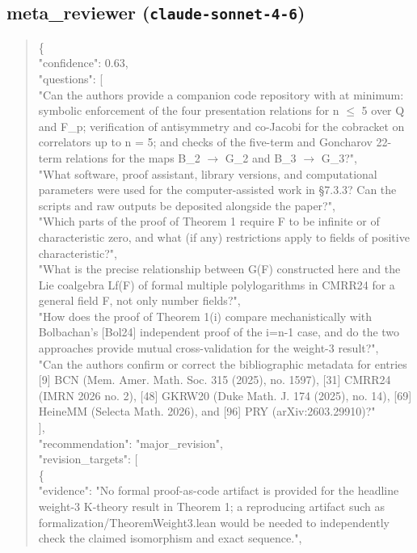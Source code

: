 \documentclass[11pt]{article}
\begin{document}
\subsection*{meta\_reviewer (\texttt{claude-sonnet-4-6})}
\begin{quote}\small\ttfamily\raggedright
\{\\
  "confidence": 0.63,\\
  "questions": [\\
    "Can the authors provide a companion code repository with at minimum: symbolic enforcement of the four presentation relations for n \ensuremath{\le} 5 over Q and F\_p; verification of antisymmetry and co-Jacobi for the cobracket on correlators up to n = 5; and checks of the five-term and Goncharov 22-term relations for the maps B\_2 \ensuremath{\to} G\_2 and B\_3 \ensuremath{\to} G\_3?",\\
    "What software, proof assistant, library versions, and computational parameters were used for the computer-assisted work in §7.3.3? Can the scripts and raw outputs be deposited alongside the paper?",\\
    "Which parts of the proof of Theorem 1 require F to be infinite or of characteristic zero, and what (if any) restrictions apply to fields of positive characteristic?",\\
    "What is the precise relationship between G(F) constructed here and the Lie coalgebra Lf(F) of formal multiple polylogarithms in CMRR24 for a general field F, not only number fields?",\\
    "How does the proof of Theorem 1(i) compare mechanistically with Bolbachan's [Bol24] independent proof of the i=n-1 case, and do the two approaches provide mutual cross-validation for the weight-3 result?",\\
    "Can the authors confirm or correct the bibliographic metadata for entries [9] BCN (Mem. Amer. Math. Soc. 315 (2025), no. 1597), [31] CMRR24 (IMRN 2026 no. 2), [48] GKRW20 (Duke Math. J. 174 (2025), no. 14), [69] HeineMM (Selecta Math. 2026), and [96] PRY (arXiv:2603.29910)?"\\
  ],\\
  "recommendation": "major\_revision",\\
  "revision\_targets": [\\
    \{\\
      "evidence": "No formal proof-as-code artifact is provided for the headline weight-3 K-theory result in Theorem 1; a reproducing artifact such as formalization/TheoremWeight3.lean would be needed to independently check the claimed isomorphism and exact sequence.",\\

\end{quote}
\end{document}
